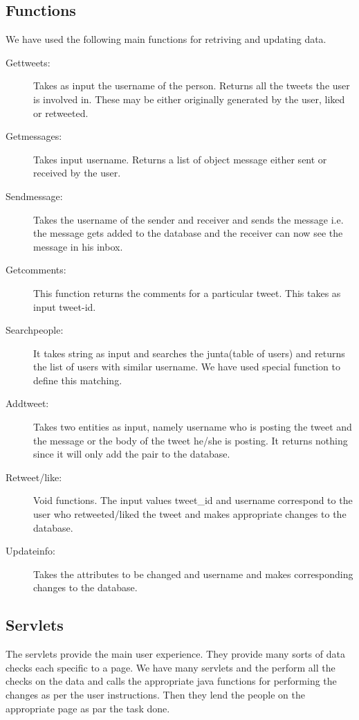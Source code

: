 \documentclass[a4paper]{article}
\begin{document}
\subsection*{{Functions}}
We have used the following main functions for retriving and updating data.
\begin{description}
\item[Gettweets: ]Takes as input the username of the person. Returns all the tweets the user is involved in. These may be either originally generated by the user, liked or retweeted.
\item[Getmessages: ]Takes input username. Returns a list of object message either sent or received by the user.
\item[Sendmessage: ]Takes the username of the sender and receiver and sends the message i.e. the message gets added to the database and the receiver can now see the message in his inbox.
\item[Getcomments: ]This function returns the comments for a particular tweet. This takes as input tweet-id.
\item[Searchpeople: ]It takes string as input and searches the junta(table of users) and returns the list of users with similar username. We have used special function to define this matching.
\item[Addtweet: ]Takes two entities as input, namely username who is posting the tweet and the message or the body of the tweet he/she is posting. It returns nothing since it will only add the pair to the database.
\item[Retweet/like: ]Void functions. The input values tweet\_id and username correspond to the user who retweeted/liked the tweet and makes appropriate changes to the database.
\item[Updateinfo: ]Takes the attributes to be changed and username and makes corresponding changes to the database.
\end{description}
\subsection*{{Servlets}}
The servlets provide the main user experience. They provide many sorts of data checks each specific to a page. We have many servlets and the perform all the checks on the data and calls the appropriate java functions for performing the changes as per the user instructions. Then they lend the people on the appropriate page as par the task done.
\end{document}

